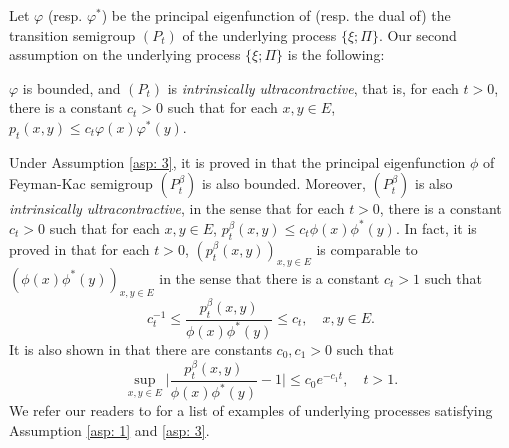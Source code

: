 \documentclass[12pt, a4paper]{amsart}
\theoremstyle{definition}
\newenvironment{asp}[1]{\renewcommand\theinnerasp{#1}\innerasp}{\endinnerasp}
\numberwithin{equation}{section}
\begin{document}
	Let $\varphi$ (resp. $\varphi^*$) be the principal eigenfunction of (resp. the dual of) the transition semigroup $(P_t)$ of the underlying process $\{\xi;\Pi\}$. Our second assumption on the underlying process $\{\xi; \Pi\}$ is the following:

\begin{asp}{3} \label{asp: 3}
	$\varphi$ is bounded, and $(P_t)$ is \emph{intrinsically ultracontractive}, that is, for each $t>0$, there is a constant $c_t >0$ such that for each $x,y\in E$, $p_t(x,y) \leq c_t \varphi(x) \varphi^*(y)$.
\end{asp}
	
	Under Assumption \ref{asp: 3},	it is proved in \cite{RenSongZhang2015Limit, RenSongZhang2017Central} that the principal eigenfunction $\phi$ of Feyman-Kac semigroup $(P^\beta_t)$ is also bounded.
	Moreover, $(P^\beta_t)$ is also \emph{intrinsically ultracontractive}, in the sense that for each $t>0$, there is a constant $c_t >0$ such that for each $x,y\in E$, $p^\beta_t(x,y) \leq c_t \phi(x) \phi^*(y)$.
	In fact, it is proved in \cite{KimSong2008Intrinsic} that for each $t>0$, $(p^\beta_t(x,y))_{x,y\in E}$ is comparable to $(\phi(x)\phi^*(y))_{x,y\in E}$ in the sense that there is a constant $c_t > 1$ such that
\[\label{eq: p-t-beta is comparable to phi phi-star}
	c_t^{-1}
	\leq \frac {p^\beta_t(x,y)} {\phi(x)\phi^*(y)}
	\leq c_t,
	\quad x,y \in E.
\]
    It is also shown in \cite{KimSong2008Intrinsic} that 
    there are constants $c_0, c_1 > 0$ such that
\[\label{eq:q(t,x,y)}
	\sup_{x,y\in E} \big|\frac{p^\beta_t(x,y)}{\phi(x)\phi^*(y)} - 1 \big| \leq c_0 e^{-c_1 t},
	\quad t > 1.
\]
	We refer our readers to \cite{RenSongZhang2015Limit} for a list of examples of underlying processes satisfying Assumption \ref{asp: 1} and \ref{asp: 3}.
\end{document}
